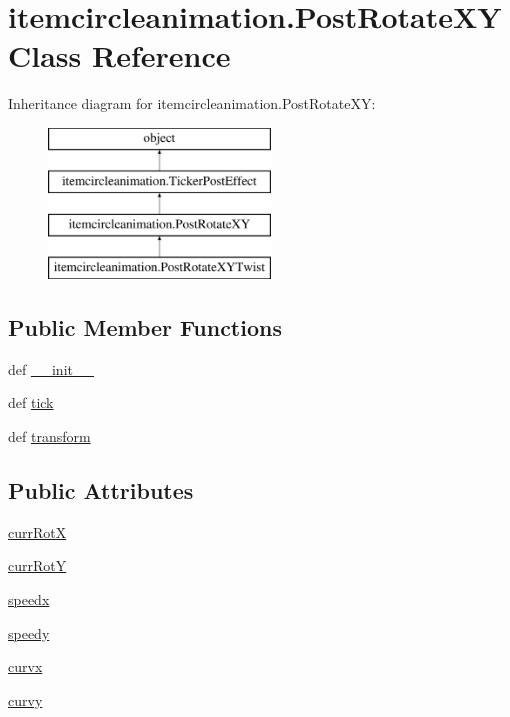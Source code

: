 \hypertarget{classitemcircleanimation_1_1PostRotateXY}{}\section{itemcircleanimation.\+Post\+Rotate\+X\+Y Class Reference}
\label{classitemcircleanimation_1_1PostRotateXY}
Inheritance diagram for itemcircleanimation.\+Post\+Rotate\+X\+Y\+:\begin{figure}[H]
\begin{center}
\leavevmode
\includegraphics[height=4.000000cm]{classitemcircleanimation_1_1PostRotateXY}
\end{center}
\end{figure}
\subsection*{Public Member Functions}
\begin{DoxyCompactItemize}
\item 
def \hyperlink{classitemcircleanimation_1_1PostRotateXY_af15585d515b3d481783f7a63d75549aa}{\+\_\+\+\_\+init\+\_\+\+\_\+}
\item 
def \hyperlink{classitemcircleanimation_1_1PostRotateXY_aad1a23b3af2a4088219f393451f7574e}{tick}
\item 
def \hyperlink{classitemcircleanimation_1_1PostRotateXY_a60076207a70b15e72265446770d66ead}{transform}
\end{DoxyCompactItemize}
\subsection*{Public Attributes}
\begin{DoxyCompactItemize}
\item 
\hyperlink{classitemcircleanimation_1_1PostRotateXY_a8ee3ee5eb68db815965afd1a6b85678a}{curr\+Rot\+X}
\item 
\hyperlink{classitemcircleanimation_1_1PostRotateXY_a3107b77612a0eea304340a4fe33050f1}{curr\+Rot\+Y}
\item 
\hyperlink{classitemcircleanimation_1_1PostRotateXY_a143c68e26618e28ab1ac550e9cfbefeb}{speedx}
\item 
\hyperlink{classitemcircleanimation_1_1PostRotateXY_aa0327e3319e99e8450f184352cc6abd7}{speedy}
\item 
\hyperlink{classitemcircleanimation_1_1PostRotateXY_a98bc9237ea142137bd0bad58f3d0a85a}{curvx}
\item 
\hyperlink{classitemcircleanimation_1_1PostRotateXY_a2c1db99c3f652677e627a9225c2954a1}{curvy}
\end{DoxyCompactItemize}


